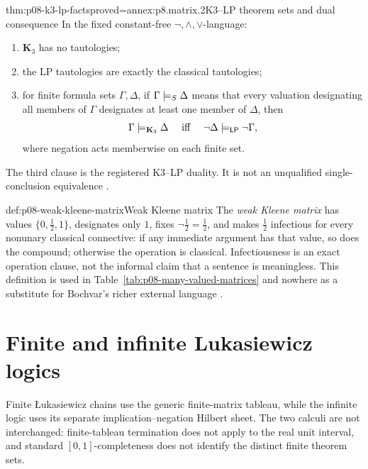 \begin{hbtheorem}{thm:p08-k3-lp-facts}{proved=annex:p8.matrix.2}{K3--LP theorem sets and dual consequence}
In the fixed constant-free \(\neg,\land,\lor\)-language:
\begin{enumerate}
  \item \(\mathbf K_3\) has no tautologies;
  \item the LP tautologies are exactly the classical tautologies;
  \item for finite formula sets \(\Gamma,\Delta\), if
        \(\Gamma\models_S\Delta\) means that every valuation designating all
        members of \(\Gamma\) designates at least one member of \(\Delta\),
        then
        \[
          \Gamma\models_{\mathbf K_3}\Delta
          \quad\text{ iff }\quad
          \neg\Delta\models_{\mathsf{LP}}\neg\Gamma,
        \]
        where negation acts memberwise on each finite set.
\end{enumerate}
The third clause is the registered K3--LP duality.  It is not an unqualified
single-conclusion equivalence \cite{Priest1979,OmoriWansing2017}.
\end{hbtheorem}

\begin{hbdefinition}{def:p08-weak-kleene-matrix}{Weak Kleene matrix}
The \emph{weak Kleene matrix} has values
\(\{0,\tfrac12,1\}\), designates only \(1\), fixes
\(\neg\tfrac12=\tfrac12\), and makes \(\tfrac12\) infectious for every
nonunary classical connective: if any immediate argument has that value, so
does the compound; otherwise the operation is classical.  Infectiousness is
an exact operation clause, not the informal claim that a sentence is
meaningless.  This definition is used in Table~\ref{tab:p08-many-valued-matrices}
and nowhere as a substitute for Bochvar's richer external language
\cite{Kleene1952}.
\end{hbdefinition}

\section{Finite and infinite Lukasiewicz logics}

Finite \L{}ukasiewicz chains use the generic finite-matrix tableau, while the
infinite logic uses its separate implication--negation Hilbert sheet.  The two
calculi are not interchanged: finite-tableau termination does not apply to the
real unit interval, and standard \([0,1]\)-completeness does not identify the
distinct finite theorem sets.

